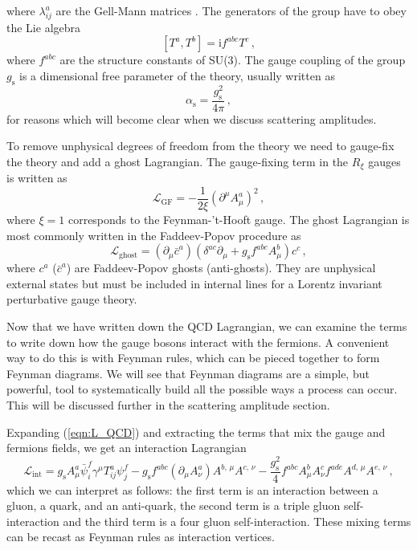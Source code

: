 \documentclass[main.tex]{subfiles}
\begin{document}
    where $\lambda^{a}_{ij}$ are the Gell-Mann matrices \cite{Gell-Mann:1962yej}.
    The generators of the group have to obey the Lie algebra
    \begin{equation}\label{eqn:lie_algebra}
        [T^{a}, T^{b}] = \mathrm{i}f^{abc}T^{c} \, ,
    \end{equation}
    where $f^{abc}$ are the structure constants of SU(3).
    The gauge coupling of the group $g_{\mathrm{s}}$
    is a dimensional free parameter of the theory, usually
    written as
    \begin{equation}\label{eqn:alpha_s}
        \alpha_{\mathrm{s}} = \dfrac{g_{\mathrm{s}}^{2}}{4\pi} \, ,
    \end{equation}
    for reasons which will become clear when we discuss
    scattering amplitudes.

    To remove unphysical degrees of freedom from the
    theory we need to gauge-fix the theory
    and add a ghost Lagrangian. The gauge-fixing term
    in the $R_{\xi}$ gauges is written as
    \begin{equation}\label{eqn:L_GF}
        \mathcal{L}_{\mathrm{GF}} = -\dfrac{1}{2\xi}(\partial^{\mu}A_{\mu}^{a})^{2} \, ,
    \end{equation}
    where $\xi = 1$ corresponds to the Feynman-'t-Hooft gauge.
    The ghost Lagrangian is most commonly written
    in the Faddeev-Popov procedure as
    \begin{equation}\label{eqn:L_ghost}
        \mathcal{L}_{\mathrm{ghost}} = (\partial_{\mu}\bar{c}^{a})(\delta^{ac}\partial_{\mu} + g_{\mathrm{s}}f^{abc}A^{b}_{\mu})c^{c} \, ,
    \end{equation}
    where $c^{a}$ ($\bar{c}^{a}$) are Faddeev-Popov ghosts (anti-ghosts).
    They are unphysical external states but must be
    included in internal lines for a Lorentz invariant
    perturbative gauge theory.

    Now that we have written down the QCD Lagrangian,
    we can examine the terms to write down how the
    gauge bosons interact with the fermions. A convenient
    way to do this is with Feynman rules, which can be
    pieced together to form Feynman diagrams. We will see
    that Feynman diagrams are a simple, but powerful, tool
    to systematically build all the possible ways a process
    can occur. This will be discussed further in the
    scattering amplitude section.

    Expanding (\ref{eqn:L_QCD}) and extracting the terms
    that mix the gauge and fermions fields, we get an interaction Lagrangian
    \begin{equation}\label{L_int}
        \mathcal{L}_{\mathrm{int}} = g_{\mathrm{s}}A^{a}_{\mu}\bar{\psi}_{i}^{f}\gamma^{\mu}T^{a}_{ij}\psi_{j}^{f}-g_{\mathrm{s}}f^{abc}(\partial_{\mu}A^{a}_{\nu})A^{b,\,\mu}A^{c,\,\nu} -\dfrac{g_{\mathrm{s}}^{2}}{4}f^{abc}A^{b}_{\mu}A^{c}_{\nu}f^{ade}A^{d,\,\mu}A^{e,\,\nu} \, ,
    \end{equation}
    which we can interpret as follows: the first term
    is an interaction between a gluon, a quark, and an
    anti-quark, the second term is a triple gluon
    self-interaction and the third term is a four gluon
    self-interaction. These mixing terms can be recast
    as Feynman rules as interaction vertices.
\end{document}
